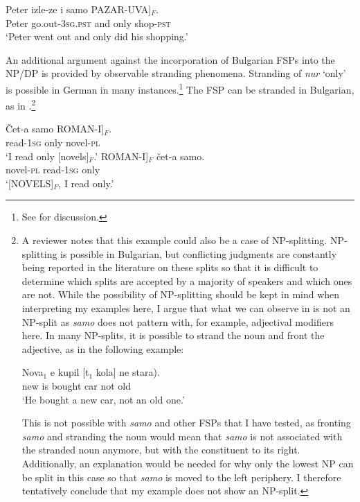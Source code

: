 \documentclass[output=paper,colorlinks,citecolor=brown]{langscibook}
\begin{document}
\ea\label{Bulgariancoordination:2} 
\gll Peter izle-ze i samo \minsp{[} PAZAR-UVA]$_{F}$. \\
Peter go.out-\textsc{3sg.pst} and only {} shop-\textsc{pst}  \\ 
\glt `Peter went out and only did his shopping.'
\z 

\noindent An additional argument against the incorporation of Bulgarian FSPs into the NP/DP is provided by observable stranding phenomena. Stranding of \textit{nur} `only' is possible in German in many instances.\footnote{See \citet{Mursell2021} for discussion.} The FSP can be stranded in Bulgarian, as in .\footnote{A reviewer notes that this example could also be a case of NP-splitting. NP-splitting is possible in Bulgarian, but conflicting judgments are constantly being reported in the literature on these splits so that it is difficult to determine which splits are accepted by a majority of speakers and which ones are not. While the possibility of NP-splitting should be kept in mind when interpreting my examples here, I argue that what we can observe in  is not an NP-split as \textit{samo} does not pattern with, for example, adjectival modifiers here. In many NP-splits, it is possible to strand the noun and front the adjective, as in the following example:

\ea
\gll Nova$_{1}$ e kupil [t$_{1}$ kola] \minsp{(} ne stara). \\
new is bought {} car {} not old \\
\glt `He bought a new car, not an old one.’\hfill \citep[ex. 36a]{TassevaDubinsky2018}
\z \par 

\noindent This is not possible with \textit{samo} and other FSPs that I have tested, as fronting \textit{samo} and stranding the noun would mean that \textit{samo} is not associated with the stranded noun anymore, but with the constituent to its right. Additionally, an explanation would be needed for why only the lowest NP can be split in this case so that \textit{samo} is moved to the left periphery. I therefore tentatively conclude that my example does not show an NP-split.} 

\ea\label{Bulgarian:stranding}
\ea
\gll \v{C}et-a samo \minsp{[} ROMAN-I]$_{F}$. \\
read-\textsc{1sg} only {} novel-\textsc{pl} \\
\glt `I read only [novels]$_{F}$.’
\ex
\gll \minsp{[} ROMAN-I]$_{F}$ \v{c}et-a samo. \\
{} novel-\textsc{pl} read-\textsc{1sg} only \\
\glt `[NOVELS]$_{F}$, I read only.’
\z
\z 
\end{document}
